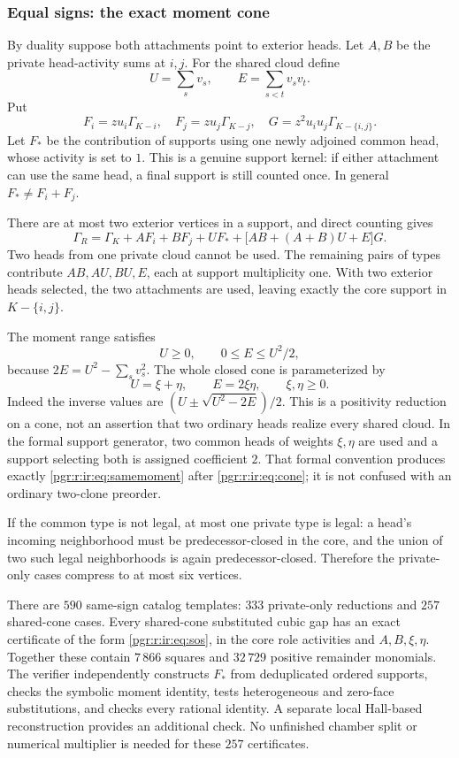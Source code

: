 \documentclass[11pt]{article}
\numberwithin{equation}{section}
\theoremstyle{definition}\newtheorem{definition}[theorem]{Definition}\newtheorem{remark}[theorem]{Remark}
\newcommand{\Ga}{\Gamma}                   %
\begin{document}
\subsubsection{Equal signs: the exact moment cone}
By duality suppose both attachments point to exterior heads. Let $A,B$ be the private head-activity sums at $i,j$. For the shared cloud define
\[
 U=\sum_s v_s,\qquad E=\sum_{s<t}v_s v_t.
\]
Put
\[
 F_i=zu_i\Ga_{K-i},\quad F_j=zu_j\Ga_{K-j},
 \quad G=z^2u_i u_j\Ga_{K-\{i,j\}}.
\]
Let $F_*$ be the contribution of supports using one newly adjoined common head, whose activity is set to $1$. This is a genuine support kernel: if either attachment can use the same head, a final support is still counted once. In general $F_*\ne F_i+F_j$.

There are at most two exterior vertices in a support, and direct counting gives
\begin{equation}\label{pgr:r:ir:eq:samemoment}
 \Ga_R=\Ga_K+A F_i+B F_j+U F_*+\bigl[AB+(A+B)U+E\bigr]G.
\end{equation}
Two heads from one private cloud cannot be used. The remaining pairs of types contribute $AB,AU,BU,E$, each at support multiplicity one. With two exterior heads selected, the two attachments are used, leaving exactly the core support in $K-\{i,j\}$.

The moment range satisfies
\[
 U\ge0,\qquad 0\le E\le U^2/2,
\]
because $2E=U^2-\sum_s v_s^2$. The whole closed cone is parameterized by
\begin{equation}\label{pgr:r:ir:eq:cone}
 U=\xi+\eta,\qquad E=2\xi\eta,
 \qquad \xi,\eta\ge0.
\end{equation}
Indeed the inverse values are $(U\pm\sqrt{U^2-2E})/2$. This is a positivity reduction on a cone, not an assertion that two ordinary heads realize every shared cloud. In the formal support generator, two common heads of weights $\xi,\eta$ are used and a support selecting both is assigned coefficient $2$. That formal convention produces exactly \eqref{pgr:r:ir:eq:samemoment} after \eqref{pgr:r:ir:eq:cone}; it is not confused with an ordinary two-clone preorder.

If the common type is not legal, at most one private type is legal: a head's incoming neighborhood must be predecessor-closed in the core, and the union of two such legal neighborhoods is again predecessor-closed. Therefore the private-only cases compress to at most six vertices.

There are $590$ same-sign catalog templates: $333$ private-only reductions and $257$ shared-cone cases. Every shared-cone substituted cubic gap has an exact certificate of the form \eqref{pgr:r:ir:eq:sos}, in the core role activities and $A,B,\xi,\eta$. Together these contain $7\,866$ squares and $32\,729$ positive remainder monomials. The verifier independently constructs $F_*$ from deduplicated ordered supports, checks the symbolic moment identity, tests heterogeneous and zero-face substitutions, and checks every rational identity. A separate local Hall-based reconstruction provides an additional check. No unfinished chamber split or numerical multiplier is needed for these $257$ certificates.
\end{document}
